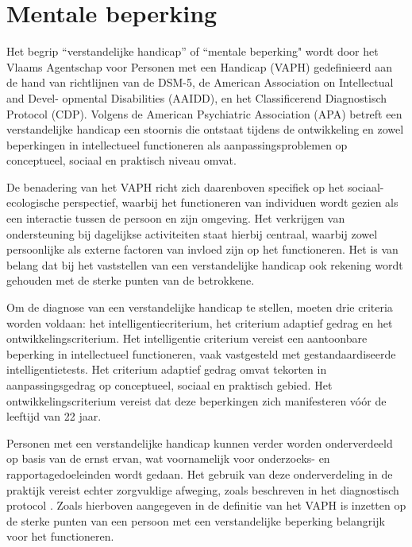 \section{Mentale beperking}
\label{sec:mentale-beperking}


Het begrip ``verstandelijke handicap'' of ``mentale beperking" wordt door het Vlaams Agentschap voor Personen met een Handicap (VAPH) gedefinieerd aan de hand van richtlijnen van de DSM-5, de American Association on Intellectual and Devel- opmental Disabilities (AAIDD), en het Classificerend Diagnostisch Protocol (CDP). Volgens de American Psychiatric Association (APA) betreft een verstandelijke handicap een stoornis die ontstaat tijdens de ontwikkeling en zowel beperkingen in intellectueel functioneren als aanpassingsproblemen op conceptueel, sociaal en praktisch niveau omvat. 

De benadering van het VAPH richt zich daarenboven specifiek op het sociaal- ecologische perspectief, waarbij het functioneren van individuen wordt gezien als een interactie tussen de persoon en zijn omgeving. Het verkrijgen van ondersteuning bij dagelijkse activiteiten staat hierbij centraal, waarbij zowel persoonlijke als externe factoren van invloed zijn op het functioneren. Het is van belang dat bij het vaststellen van een verstandelijke handicap ook rekening wordt gehouden met de sterke punten van de betrokkene. 

Om de diagnose van een verstandelijke handicap te stellen, moeten drie criteria worden voldaan: het intelligentiecriterium, het criterium adaptief gedrag en het ontwikkelingscriterium. Het intelligentie criterium vereist een aantoonbare beperking in intellectueel functioneren, vaak vastgesteld met gestandaardiseerde intelligentietests. Het criterium adaptief gedrag omvat tekorten in aanpassingsgedrag op conceptueel, sociaal en praktisch gebied. Het ontwikkelingscriterium vereist dat deze beperkingen zich manifesteren vóór de leeftijd van 22 jaar. 

Personen met een verstandelijke handicap kunnen verder worden onderverdeeld op basis van de ernst ervan, wat voornamelijk voor on\-der\-zoeks- en rapportagedoeleinden wordt gedaan. Het gebruik van deze onderverdeling in de praktijk vereist echter zorgvuldige afweging, zoals beschreven in het diagnostisch protocol \autocite{VAPH}. Zoals hierboven aangegeven in de definitie van het VAPH is inzetten op de sterke punten van een persoon met een verstandelijke beperking belangrijk voor het functioneren.

